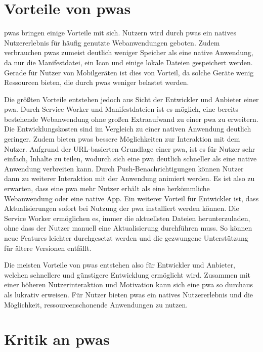 \documentclass[12pt, parskip=half]{scrartcl}       %
\begin{document}
\section{Vorteile von \acp{pwa}}

\acp{pwa} bringen einige Vorteile mit sich.
Nutzern wird durch \acp{pwa} ein natives Nutzererlebnis für häufig genutzte Webanwendungen geboten.
Zudem verbrauchen \acp{pwa} zumeist deutlich weniger Speicher als eine native Anwendung, da nur die Manifestdatei, ein Icon und einige lokale Dateien gespeichert werden.
Gerade für Nutzer von Mobilgeräten ist dies von Vorteil, da solche Geräte wenig Ressourcen bieten, die durch \acp{pwa} weniger belastet werden.

Die größten Vorteile entstehen jedoch aus Sicht der Entwickler und Anbieter einer \ac{pwa}.
Durch Service Worker und Manifestdateien ist es möglich, eine bereits bestehende Webanwendung ohne großen Extraaufwand zu einer \ac{pwa} zu erweitern.
Die Entwicklungskosten sind im Vergleich zu einer nativen Anwendung deutlich geringer.
Zudem bieten \acp{pwa} bessere Möglichkeiten zur Interaktion mit dem Nutzer.
Aufgrund der URL-basierten Grundlage einer \ac{pwa}, ist es für Nutzer sehr einfach, Inhalte zu teilen, wodurch sich eine \ac{pwa} deutlich schneller als eine native Anwendung verbreiten kann.
Durch Push-Benachrichtigungen können Nutzer dann zu weiterer Interaktion mit der Anwendung animiert werden.
Es ist also zu erwarten, dass eine \ac{pwa} mehr Nutzer erhält als eine herkömmliche Webanwendung oder eine native App.
Ein weiterer Vorteil für Entwickler ist, dass Aktualisierungen sofort bei Nutzung der \ac{pwa} installiert werden können.
Die Service Worker ermöglichen es, immer die aktuellsten Dateien herunterzuladen, ohne dass der Nutzer manuell eine Aktualisierung durchführen muss.
So können neue Features leichter durchgesetzt werden und die gezwungene Unterstützung für ältere Versionen entfällt.

Die meisten Vorteile von \acp{pwa} entstehen also für Entwickler und Anbieter, welchen schnellere und günstigere Entwicklung ermöglicht wird.
Zusammen mit einer höheren Nutzerinteraktion und Motivation kann sich eine \ac{pwa} so durchaus als lukrativ erweisen.
Für Nutzer bieten \acp{pwa} ein natives Nutzererlebnis und die Möglichkeit, ressourcenschonende Anwendungen zu nutzen.


\section{Kritik an \acp{pwa}}
\end{document}
